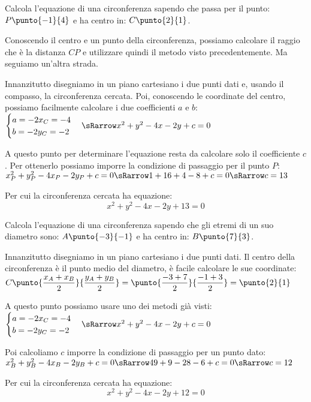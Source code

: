 \begin{esempio}
Calcola l'equazione di una circonferenza sapendo che passa per il punto:
\(P\punto{-1}{4}\) e ha centro in: \(C\punto{2}{1}\).

Conoscendo il centro e un punto della circonferenza, possiamo calcolare il 
raggio che è la distanza \(CP\) e utilizzare quindi il metodo visto 
precedentemente. 
Ma seguiamo un'altra strada. 

Innanzitutto disegniamo in un piano cartesiano i 
due punti dati e, usando il compasso, la circonferenza cercata.
Poi, conoscendo le coordinate del centro, possiamo facilmente calcolare i due 
coefficienti \(a\) e \(b\): \\
\(\sistema{a = -2x_C = -4 \\ b = -2y_C = -2} \sRarrow x^2 +y^2 -4x -2y +c = 0\) 

A questo punto per determinare l'equazione resta da calcolare solo il 
coefficiente \(c\). Per ottenerlo possiamo imporre la condizione di passaggio 
per il punto \(P\): \\
\(x_P^2 +y_P^2 -4x_P -2y_P +c = 0 \sRarrow 1 + 16 +4 -8 +c = 0 \sRarrow 
  c = 13\)

Per cui la circonferenza cercata ha equazione:
\[x^2 +y^2 -4x -2y +13 = 0\]
\end{esempio}

\begin{esempio}
Calcola l'equazione di una circonferenza sapendo che gli etremi di un suo 
diametro sono:
\(A\punto{-3}{-1}\) e ha centro in: \(B\punto{7}{3}\).

Innanzitutto disegniamo in un piano cartesiano i due punti dati.
Il centro della circonferenza è il punto medio del diametro, è 
facile calcolare le sue coordinate: \\
\(C\punto{\dfrac{x_A + x_B}{2}}{\dfrac{y_A + y_B}{2}} = 
\punto{\dfrac{-3 + 7}{2}}{\dfrac{-1 + 3}{2}} = \punto{2}{1}\)

A questo punto possiamo usare uno dei metodi già visti: \\
\(\sistema{a = -2x_C = -4 \\ b = -2y_C = -2} \sRarrow x^2 +y^2 -4x -2y +c = 0\) 

Poi calcoliamo \(c\) imporre la condizione di passaggio per un punto dato: \\
\(x_B^2 +y_B^2 -4x_B -2y_B +c = 0 \sRarrow 49 + 9 -28 -6 +c = 0 \sRarrow 
  c = 12\)

Per cui la circonferenza cercata ha equazione:
\[x^2 +y^2 -4x -2y +12 = 0\]
\end{esempio}

